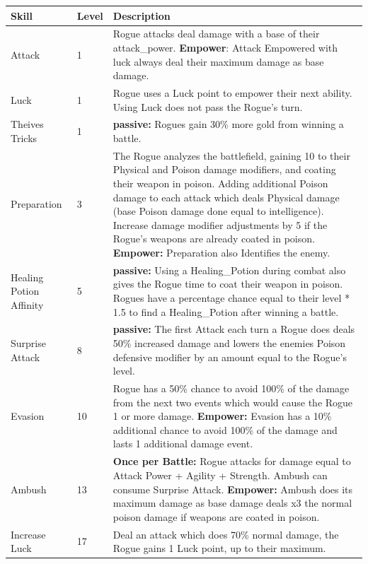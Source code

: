 \documentclass[12pt]{article} %
\begin{document}
\begin{footnotesize}
\begin{center}
\begin{tabular}{ | m{3cm} | m{1.5cm} | m{10cm} | }
\hline
Skill & Level & Description \\
\hline
Attack & 1 & Rogue attacks deal damage with a base of their attack\_power. \textbf{Empower}: Attack Empowered with luck always deal their maximum damage as base damage. \\
\hline
Luck & 1 & Rogue uses a Luck point to empower their next ability. Using Luck does not pass the Rogue’s turn.\\
\hline
Theives Tricks & 1 & \textbf{passive:} Rogues gain 30\% more gold from winning a battle.\\
\hline
Preparation & 3 & The Rogue analyzes the battlefield, gaining 10 to their Physical and Poison damage modifiers, and coating their weapon in poison. Adding additional Poison damage to each attack which deals Physical damage (base Poison damage done equal to intelligence). Increase damage modifier adjustments by 5 if the Rogue’s weapons are already coated in poison. \textbf{Empower:} Preparation also Identifies the enemy. \\
\hline
Healing Potion Affinity & 5 & \textbf{passive:} Using a Healing\_Potion during combat also gives the Rogue time to coat their weapon in poison. Rogues have a percentage chance equal to their level * 1.5 to find a Healing\_Potion after winning a battle. \\
\hline
Surprise Attack & 8 & \textbf{passive:} The first Attack each turn a Rogue does deals 50\% increased damage and lowers the enemies Poison defensive modifier by an amount equal to the Rogue’s level.\\
\hline
Evasion & 10 & Rogue has a 50\% chance to avoid 100\% of the damage from the next two events which would cause the Rogue 1 or more damage. \textbf{Empower:} Evasion has a 10\% additional chance to avoid 100\% of the damage and lasts 1 additional damage event. \\
\hline
Ambush & 13 & \textbf{Once per Battle:} Rogue attacks for damage equal to Attack Power + Agility + Strength.  Ambush can consume Surprise Attack. \textbf{Empower:} Ambush does its maximum damage as base damage deals x3 the normal poison damage if weapons are coated in poison. \\
\hline
Increase Luck & 17 & Deal an attack which does 70\% normal damage, the Rogue gains 1 Luck point, up to their maximum. \\

\end{tabular}
\end{center}
\end{footnotesize}
\end{document}

